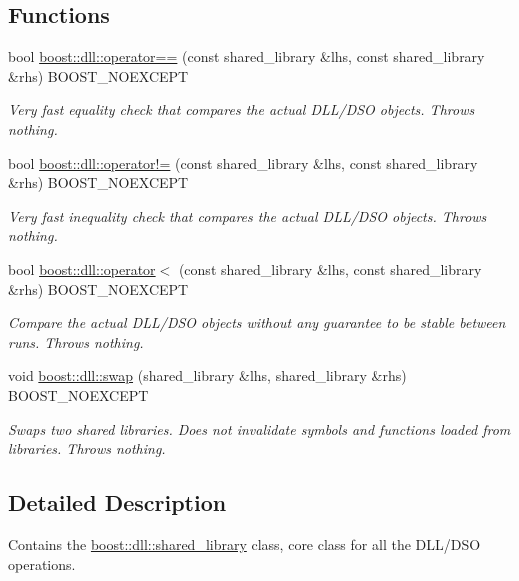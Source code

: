 \subsection*{Functions}
\begin{DoxyCompactItemize}
\item 
bool \hyperlink{a00726_ad7233544269202b94686d41bea52d0ac}{boost\+::dll\+::operator==} (const shared\+\_\+library \&lhs, const shared\+\_\+library \&rhs) B\+O\+O\+S\+T\+\_\+\+N\+O\+E\+X\+C\+E\+PT\hypertarget{a00726_ad7233544269202b94686d41bea52d0ac}{}\label{a00726_ad7233544269202b94686d41bea52d0ac}

\begin{DoxyCompactList}\small\item\em Very fast equality check that compares the actual D\+L\+L/\+D\+SO objects. Throws nothing. \end{DoxyCompactList}\item 
bool \hyperlink{a00726_aa9ae3e7be3360300ed88c56f9768a398}{boost\+::dll\+::operator!=} (const shared\+\_\+library \&lhs, const shared\+\_\+library \&rhs) B\+O\+O\+S\+T\+\_\+\+N\+O\+E\+X\+C\+E\+PT\hypertarget{a00726_aa9ae3e7be3360300ed88c56f9768a398}{}\label{a00726_aa9ae3e7be3360300ed88c56f9768a398}

\begin{DoxyCompactList}\small\item\em Very fast inequality check that compares the actual D\+L\+L/\+D\+SO objects. Throws nothing. \end{DoxyCompactList}\item 
bool \hyperlink{a00726_a623bee5ffa66c763e20d2333fa4e21a9}{boost\+::dll\+::operator$<$} (const shared\+\_\+library \&lhs, const shared\+\_\+library \&rhs) B\+O\+O\+S\+T\+\_\+\+N\+O\+E\+X\+C\+E\+PT\hypertarget{a00726_a623bee5ffa66c763e20d2333fa4e21a9}{}\label{a00726_a623bee5ffa66c763e20d2333fa4e21a9}

\begin{DoxyCompactList}\small\item\em Compare the actual D\+L\+L/\+D\+SO objects without any guarantee to be stable between runs. Throws nothing. \end{DoxyCompactList}\item 
void \hyperlink{a00726_aa1a3e7ddd810a581916551d8275c5e3f}{boost\+::dll\+::swap} (shared\+\_\+library \&lhs, shared\+\_\+library \&rhs) B\+O\+O\+S\+T\+\_\+\+N\+O\+E\+X\+C\+E\+PT\hypertarget{a00726_aa1a3e7ddd810a581916551d8275c5e3f}{}\label{a00726_aa1a3e7ddd810a581916551d8275c5e3f}

\begin{DoxyCompactList}\small\item\em Swaps two shared libraries. Does not invalidate symbols and functions loaded from libraries. Throws nothing. \end{DoxyCompactList}\end{DoxyCompactItemize}


\subsection{Detailed Description}
Contains the \hyperlink{a00271}{boost\+::dll\+::shared\+\_\+library} class, core class for all the D\+L\+L/\+D\+SO operations. 

